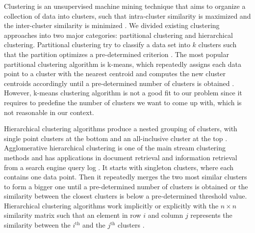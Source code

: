 Clustering is an unsupervised machine mining technique that aims to organize a collection of data into clusters, such that intra-cluster similarity is maximized and the inter-cluster similarity is minimized \cite{karypis1999chameleon,grira2004unsupervised}. We divided existing clustering approaches into two major categories: partitional clustering and hierarchical clustering. Partitional clustering try to classify a data set into $k$ clusters such that the partition optimizes a pre-determined criterion \cite{karypis1999chameleon}. The most popular partitional clustering algorithm is k-means, which repeatedly assigns each data point to a cluster with the nearest centroid and computes the new cluster centroids accordingly until a pre-determined number of clusters is obtained \cite{bouguettaya2015efficient}. However, k-means clustering algorithm is not a good fit to our problem since it requires to predefine the number of clusters we want to come up with, which is not reasonable in our context. %

Hierarchical clustering algorithms produce a nested grouping of clusters, with single point clusters at the bottom and an all-inclusive cluster at the top \cite{karypis1999chameleon}. Agglomerative hierarchical clustering is one of the main stream clustering methods \cite{day1984efficient} and has applications in document retrieval \cite{voorhees1986implementing} and information retrieval from a search engine query log \cite{beeferman2000agglomerative}. It starts with singleton clusters, where each contains one data point. Then it repeatedly merges the two most similar clusters to form a bigger one until a pre-determined number of clusters is obtained or the similarity between the closest clusters is below a pre-determined threshold value. Hierarchical clustering algorithms work implicitly or explicitly with the $n \times n$ similarity matrix such that an element in row $i$ and column $j$ represents the similarity between the $i^{\text{th}}$ and the $j^{\text{th}}$ clusters \cite{karypis1999chameleon}.

